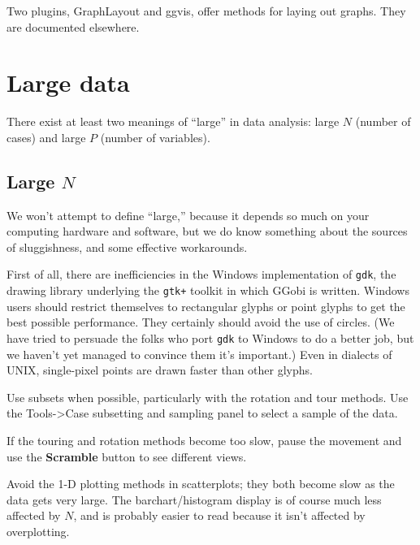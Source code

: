\documentclass[11pt]{article}
\def\Widget#1{\textbf{#1}}
\begin{document}
{Two plugins, GraphLayout and ggvis, offer methods for laying out
graphs.  They are documented elsewhere.

\section{Large data}

There exist at least two meanings of ``large'' in data analysis: large
$N$ (number of cases) and large $P$ (number of variables).  

\subsection{Large $N$}

We won't attempt to define ``large,'' because it depends so much on
your computing hardware and software, but we do know something about
the sources of sluggishness, and some effective workarounds.

First of all, there are inefficiencies in the Windows implementation
of \verb|gdk|, the drawing library underlying the \verb|gtk+| toolkit
in which GGobi is written.  Windows users should restrict themselves to
rectangular glyphs or point glyphs to get the best possible performance.
They certainly should avoid the use of circles.  (We have tried to
persuade the folks who port \verb|gdk| to Windows to do a better job,
but we haven't yet managed to convince them it's important.)  Even in
dialects of UNIX, single-pixel points are drawn faster than other glyphs.

Use subsets when possible, particularly with the rotation and tour
methods.  Use the Tools->Case subsetting and sampling panel to select
a sample of the data.

If the touring and rotation methods become too slow, pause the movement
and use the \Widget{Scramble} button to see different views.

Avoid the 1-D plotting methods in scatterplots; they both become slow
as the data gets very large.  The barchart/histogram display is of course
much less affected by $N$, and is probably easier to read because it
isn't affected by overplotting.

}
\end{document}
